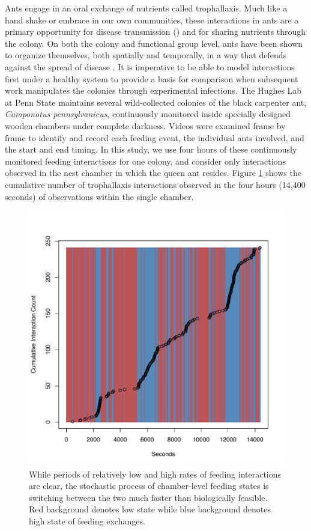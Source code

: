\documentclass[cmbright,fleqn,referee]{envauth}
\begin{document}
Ants engage in an oral exchange of nutrients called trophallaxis. Much like a hand shake or embrace in our own communities, these interactions in ants are a primary opportunity for disease transmission (\cite{Naug2002}) and for sharing nutrients through the colony. On both the colony and functional group level, ants have been shown to organize themselves, both spatially and temporally, in a way that defends against the spread of disease \citep{Quevillon2015}. It is imperative to be able to model interactions first under a healthy system to provide a basis for comparison when subsequent work manipulates the colonies through experimental infections. The Hughes Lab at Penn State maintains several wild-collected colonies of the black carpenter ant, \textit{Camponotus pennsylvanicus}, continuously monitored inside specially designed wooden chambers under complete darkness. Videos were examined frame by frame to identify and record each feeding event, the individual ants involved, and the start and end timing. In this study, we use four hours of these continuously monitored feeding interactions for one colony, and consider only interactions observed in the nest chamber in which the queen ant resides. Figure \ref{f:simplestates} shows the cumulative number of trophallaxis interactions observed in the four hours (14,400 seconds) of observations within the single chamber.

\begin{figure}
 \centerline{\includegraphics[width=6in]{Sim2_MSPE120000_states.pdf}}
\caption{While periods of relatively low and high rates of feeding interactions are clear, the stochastic process of chamber-level feeding states is switching between the two much faster than biologically feasible. Red background denotes low state while blue background denotes high state of feeding exchanges. }
\label{f:simplestates}
\end{figure}
\end{document}
